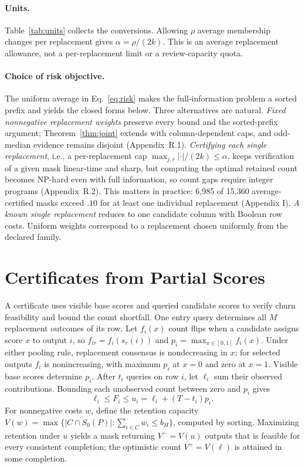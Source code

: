 \documentclass[11pt]{article}
\newcommand{\bH}{b_H}
\newcommand{\Sz}{S_0}
\begin{document}
\paragraph{Units.} Table~\ref{tab:units} collects the conversions. Allowing $\rho$ average membership changes per replacement gives $\alpha=\rho/(2k)$. This is an average replacement allowance, not a per-replacement limit or a review-capacity quota.

\paragraph{Choice of risk objective.} The uniform average in Eq.~\eqref{eq:risk} makes the full-information problem a sorted prefix and yields the closed forms below. Three alternatives are natural. \emph{Fixed nonnegative replacement weights} preserve every bound and the sorted-prefix argument; Theorem~\ref{thm:joint} extends with column-dependent caps, and odd-median evidence remains disjoint (Appendix~R.1). \emph{Certifying each single replacement}, i.e., a per-replacement cap $\max_{j,r}|\cdot|/(2k)\le\alpha$, keeps verification of a given mask linear-time and sharp, but computing the optimal retained count becomes NP-hard even with full information, so count gaps require integer programs (Appendix~R.2). This matters in practice: 6,985 of 15,360 average-certified masks exceed $.10$ for at least one individual replacement (Appendix I). \emph{A known single replacement} reduces to one candidate column with Boolean row costs. Uniform weights correspond to a replacement chosen uniformly from the declared family.

\section{Certificates from Partial Scores}
\label{sec:cert}
A certificate uses visible base scores and queried candidate scores to verify churn feasibility and bound the count shortfall. One entry query determines all $M$ replacement outcomes of its row. Let $f_i(x)$ count flips when a candidate assigns score $x$ to output $i$, so $f_{ir}=f_i(s_r(i))$ and $p_i=\max_{x\in[0,1]}f_i(x)$. Under either pooling rule, replacement consensus is nondecreasing in $x$; for selected outputs $f_i$ is nonincreasing, with maximum $p_i$ at $x=0$ and zero at $x=1$. Visible base scores determine $p_i$. After $t_i$ queries on row $i$, let $\ell_i$ sum their observed contributions. Bounding each unobserved count between zero and $p_i$ gives
\begin{equation}
\ell_i\le F_i\le u_i=\ell_i+(T-t_i)p_i.
\label{eq:bounds}
\end{equation}
For nonnegative costs $w$, define the retention capacity $V(w)=\max\{|C\cap\Sz(P)|:\sum_{i\in C}w_i\le\bH\}$, computed by sorting. Maximizing retention under $u$ yields a mask returning $V^-=V(u)$ outputs that is feasible for every consistent completion; the optimistic count $V^+=V(\ell)$ is attained in some completion.
\end{document}

